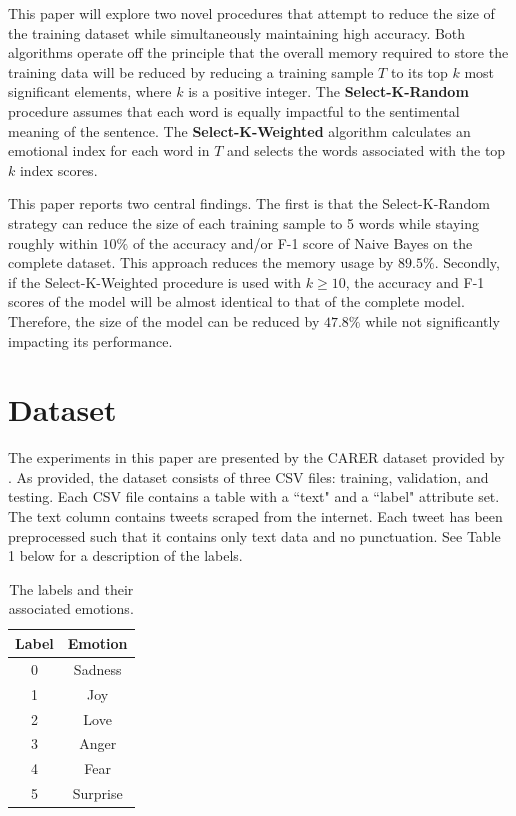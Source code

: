\documentclass[11pt]{article}
\begin{document}
This paper will explore two novel procedures that attempt to reduce the size of the training dataset while simultaneously maintaining high accuracy. Both algorithms operate off the principle that the overall memory required to store the training data will be reduced by reducing a training sample $T$ to its top $k$ most significant elements, where $k$ is a positive integer. The \textbf{Select-K-Random} procedure assumes that each word is equally impactful to the sentimental meaning of the sentence. The \textbf{Select-K-Weighted} algorithm calculates an emotional index for each word in $T$ and selects the words associated with the top $k$ index scores.

This paper reports two central findings. The first is that the Select-K-Random strategy can reduce the size of each training sample to 5 words while staying roughly within $10\%$ of the accuracy and/or F-1 score of Naive Bayes on the complete dataset. This approach reduces the memory usage by $89.5\%$. Secondly, if the Select-K-Weighted procedure is used with $k\geq 10$, the accuracy and F-1 scores of the model will be almost identical to that of the complete model. Therefore, the size of the model can be reduced by $47.8\%$ while not significantly impacting its performance.

\section{Dataset}
The experiments in this paper are presented by the CARER dataset provided by \citet{saravia2018carer}. As provided, the dataset consists of three CSV files: training, validation, and testing. Each CSV file contains a table with a ``text" and a ``label" attribute set. The text column contains tweets scraped from the internet. Each tweet has been preprocessed such that it contains only text data and no punctuation. See Table 1 below for a description of the labels.

\begin{table}[h!]
\centering
\begin{tabular}{cc}
\textbf{Label}          & \textbf{Emotion}              \\ \hline
\multicolumn{1}{|c|}{0} & \multicolumn{1}{c|}{Sadness}  \\ \hline
\multicolumn{1}{|c|}{1} & \multicolumn{1}{c|}{Joy}      \\ \hline
\multicolumn{1}{|c|}{2} & \multicolumn{1}{c|}{Love}     \\ \hline
\multicolumn{1}{|c|}{3} & \multicolumn{1}{c|}{Anger}    \\ \hline
\multicolumn{1}{|c|}{4} & \multicolumn{1}{c|}{Fear}     \\ \hline
\multicolumn{1}{|c|}{5} & \multicolumn{1}{c|}{Surprise} \\ \hline
\end{tabular}
\caption{The labels and their associated emotions.}
\label{EmotionLabels}
\end{table}
\end{document}
